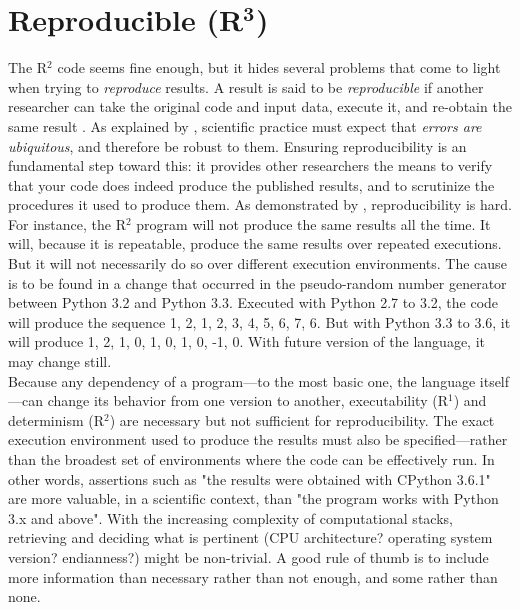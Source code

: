 \documentclass[a4paper,11pt]{article}
\begin{document}
\section*{Reproducible (R$^{\mathbf 3}$)}

The R$^2$ code seems fine enough, but it hides several problems that come to light when trying to {\em reproduce} results. A result is said to be \emph{reproducible} if another researcher can take the original code and input data, execute it, and re-obtain the same result \parencite{Peng:2006}. As explained by \citeauthor{Donoho:2009} \parencite{Donoho:2009}, scientific practice must expect that {\em errors are ubiquitous}, and therefore be robust to them. Ensuring reproducibility is an fundamental step toward this: it provides other researchers the means to verify that your code does indeed produce the published results, and to scrutinize the procedures it used to produce them. As demonstrated by \citeauthor{Mesnard:2016} \citep{Mesnard:2016}, reproducibility is hard.\\

For instance, the R$^2$ program will not produce the same results all the time. It will, because it is repeatable, produce the same results over repeated executions. But it will not necessarily do so over different execution environments. The cause is to be found in a change that occurred in the pseudo-random number generator between Python 3.2 and Python 3.3. Executed with Python 2.7 to 3.2, the code will produce the sequence 1, 2, 1, 2, 3, 4, 5, 6, 7, 6. But with Python 3.3 to 3.6, it will produce 1, 2, 1, 0, 1, 0, 1, 0, -1, 0. With future version of the language, it may change still.\\

Because any dependency of a program---to the most basic one, the language itself---can change its behavior from one version to another, executability (R$^1$) and determinism (R$^2$) are necessary but not sufficient for reproducibility. The exact execution environment used to produce the results must also be specified---rather than the broadest set of environments where the code can be effectively run. In other words, assertions such as "the results were obtained with CPython 3.6.1" are more valuable, in a scientific context, than "the program works with Python 3.x and above". With the increasing complexity of computational stacks, retrieving and deciding what is pertinent (CPU architecture? operating system version? endianness?) might be non-trivial. A good rule of thumb is to include more information than necessary rather than not enough, and some rather than none.\\
\end{document}
